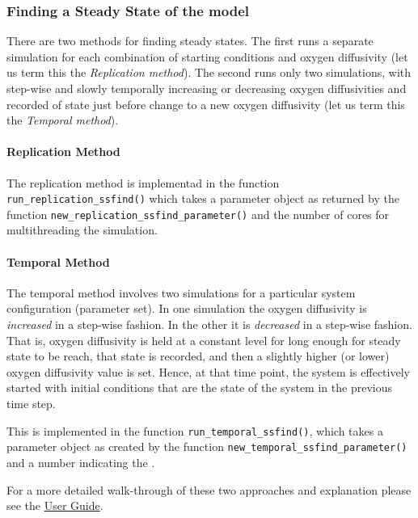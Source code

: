 \documentclass[]{elsarticle} %
\begin{document}
\hypertarget{finding-a-steady-state-of-the-model}{%
\subsubsection{Finding a Steady State of the
model}\label{finding-a-steady-state-of-the-model}}

There are two methods for finding steady states. The first runs a
separate simulation for each combination of starting conditions and
oxygen diffusivity (let us term this the \emph{Replication method}). The
second runs only two simulations, with step-wise and slowly temporally
increasing or decreasing oxygen diffusivities and recorded of state just
before change to a new oxygen diffusivity (let us term this the
\emph{Temporal method}).

\hypertarget{replication-method}{%
\paragraph{Replication Method}\label{replication-method}}

The replication method is implementad in the function
\texttt{run\_replication\_ssfind()} which takes a parameter object as
returned by the function \texttt{new\_replication\_ssfind\_parameter()}
and the number of cores for multithreading the simulation.

\hypertarget{temporal-method}{%
\paragraph{Temporal Method}\label{temporal-method}}

The temporal method involves two simulations for a particular system
configuration (parameter set). In one simulation the oxygen diffusivity
is \emph{increased} in a step-wise fashion. In the other it is
\emph{decreased} in a step-wise fashion. That is, oxygen diffusivity is
held at a constant level for long enough for steady state to be reach,
that state is recorded, and then a slightly higher (or lower) oxygen
diffusivity value is set. Hence, at that time point, the system is
effectively started with initial conditions that are the state of the
system in the previous time step.

This is implemented in the function \texttt{run\_temporal\_ssfind()},
which takes a parameter object as created by the function
\texttt{new\_temporal\_ssfind\_parameter()} and a number indicating the
.

For a more detailed walk-through of these two approaches and explanation
please see the \href{@LINK_NEEDED}{User Guide}.
\end{document}
